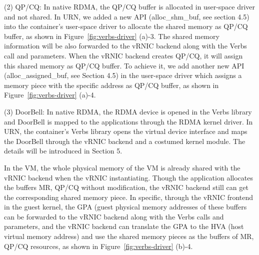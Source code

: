 (2) QP/CQ: In native RDMA, the QP/CQ buffer is allocated in user-space driver and not shared. In URN, we added a new API (alloc\_shm\_buf, see section 4.5) into the container's user-space driver to allocate the shared memory as QP/CQ buffer, as shown in Figure~\ref{fig:verbs-driver} (a)-3. The shared memory information will be also forwarded to the vRNIC backend along with the Verbs call and parameters. When the vRNIC backend creates QP/CQ, it will assign this shared memory as QP/CQ buffer. To achieve it, we add another new API (alloc\_assigned\_buf, see Section 4.5) in the user-space driver which assigns a memory piece with the specific address as QP/CQ buffer, as shown in Figure~\ref{fig:verbs-driver} (a)-4.

(3) DoorBell: In native RDMA, the RDMA device is opened in the Verbs library and DoorBell is mapped to the applications through the RDMA kernel driver. In URN, the container's Verbs library opens the virtual device interface and maps the DoorBell through the vRNIC backend and a costumed kernel module. The details will be introduced in Section 5.

In the VM, the whole physical memory of the VM is already shared with the vRNIC backend when the vRNIC instantiating. Though the application allocates the buffers MR, QP/CQ without modification, the vRNIC backend still can get the corresponding shared memory piece. In specific, through the vRNIC frontend in the guest kernel, the GPA (guest physical memory addresses of these buffers can be forwarded to the vRNIC backend along with the Verbs calls and parameters, and the vRNIC backend can translate the GPA to the HVA (host virtual memory address) and use the shared memory pieces as the buffers of MR, QP/CQ resources, as shown in Figure~\ref{fig:verbs-driver} (b)-4.

